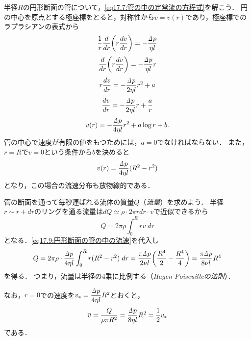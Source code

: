 半径$R$の円形断面の管について，\eqref{eq17.7:管の中の定常流の方程式}を解こう．
円の中心を原点とする極座標をとると，対称性から$v=v(r)$であり，極座標でのラプラシアンの表式から
\[
    \frac{1}{r} \dv{r} \pqty{r\dv{v}{r}} = -\frac{\D p}{\eta l}
\]
\[
    \dv{r} \pqty{r\dv{v}{r}} = -\frac{\D p}{\eta l}r
\]
\[
    r\dv{v}{r} = -\frac{\D p}{2\eta l}r^2 + a
\]
\[
    \dv{v}{r} = -\frac{\D p}{2\eta l}r + \frac{a}{r}
\]
\begin{equation}\label{eq17.8:管の中の流速（極座標での一般形）}
    v(r) = -\frac{\D p}{4\eta l}r^2 + a \log r + b.
\end{equation}
管の中心で速度が有限の値をもつためには，$a=0$でなければならない．
また，$r=R$で$v=0$という条件から$b$を決めると
\begin{equation}\label{eq17.9:円形断面の管の中の流速}
    v(r) = \frac{\D p}{4\eta l} (R^2-r^2)
\end{equation}
となり，この場合の流速分布も放物線的である．


管の断面を通って毎秒運ばれる流体の質量$Q$（\emph{流量}）を求めよう．
半径$r \sim r+dr$のリングを通る流量は$dQ \simeq \rho \cdot 2\pi rdr \cdot v$で近似できるから
\[
    Q = 2\pi\rho \int_0^R rv  \; dr
\]
となる．\eqref{eq17.9:円形断面の管の中の流速}を代入し
\begin{equation}\label{eq17.10:Hagen-Poiseuilleの法則}
    Q = 2\pi\rho \cdot \frac{\D p}{4\eta l} \int_0^R r(R^2-r^2) \; dr
    = \frac{\pi\D p}{2\nu l} \pqty{\frac{R^4}{2}-\frac{R^4}{4}} = \frac{\pi\D p}{8\nu l} R^4
\end{equation}
を得る．
つまり，流量は半径の4乗に比例する（\emph{Hagen-Poiseuilleの法則}）．

なお，$r=0$での速度を$v_* = \dfrac{\D p}{4\eta l}R^2$とおくと，
\[
    \overline{v} = \frac{Q}{\rho\pi R^2} = \frac{\D p}{8\eta l}R^2 = \frac{1}{2} v_*
\]
である．



\BackToTheToc



